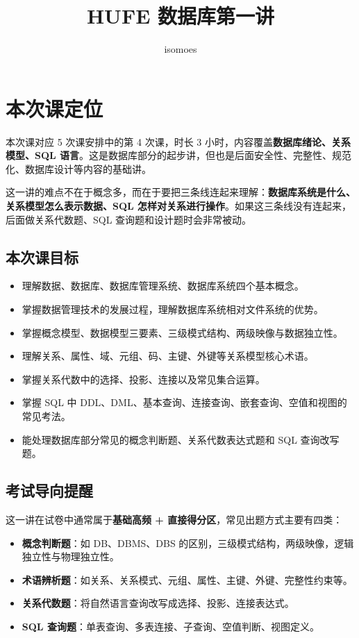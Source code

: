 \documentclass{../../note}
\title{HUFE 数据库第一讲}
\author{isomoes}
\begin{document}
\maketitle

\section{本次课定位}

本次课对应 5 次课安排中的第 4 次课，时长 3 小时，内容覆盖\textbf{数据库绪论、关系模型、SQL 语言}。这是数据库部分的起步讲，但也是后面安全性、完整性、规范化、数据库设计等内容的基础讲。

这一讲的难点不在于概念多，而在于要把三条线连起来理解：\textbf{数据库系统是什么、关系模型怎么表示数据、SQL 怎样对关系进行操作}。如果这三条线没有连起来，后面做关系代数题、SQL 查询题和设计题时会非常被动。

\subsection{本次课目标}

\begin{itemize}
  \item 理解数据、数据库、数据库管理系统、数据库系统四个基本概念。
  \item 掌握数据管理技术的发展过程，理解数据库系统相对文件系统的优势。
  \item 掌握概念模型、数据模型三要素、三级模式结构、两级映像与数据独立性。
  \item 理解关系、属性、域、元组、码、主键、外键等关系模型核心术语。
  \item 掌握关系代数中的选择、投影、连接以及常见集合运算。
  \item 掌握 SQL 中 DDL、DML、基本查询、连接查询、嵌套查询、空值和视图的常见考法。
  \item 能处理数据库部分常见的概念判断题、关系代数表达式题和 SQL 查询改写题。
\end{itemize}

\subsection{考试导向提醒}

这一讲在试卷中通常属于\textbf{基础高频 + 直接得分区}，常见出题方式主要有四类：

\begin{itemize}
  \item \textbf{概念判断题}：如 DB、DBMS、DBS 的区别，三级模式结构，两级映像，逻辑独立性与物理独立性。
  \item \textbf{术语辨析题}：如关系、关系模式、元组、属性、主键、外键、完整性约束等。
  \item \textbf{关系代数题}：将自然语言查询改写成选择、投影、连接表达式。
  \item \textbf{SQL 查询题}：单表查询、多表连接、子查询、空值判断、视图定义。
\end{itemize}
\end{document}
